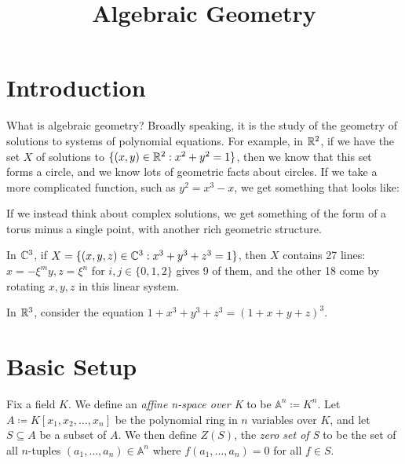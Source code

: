 \documentclass[10pt,a4paper]{article}
\title{Algebraic Geometry}
\begin{document}
\maketitle

\setcounter{section}{-1}

\section{Introduction}
What is algebraic geometry? Broadly speaking, it is the study of the geometry of solutions to systems of polynomial equations. For example, in $\mathbb{R}^2$, if we have the set $X$ of solutions to $\{(x,y)\in \mathbb{R}^2 : x^2+y^2 = 1\}$, then we know that this set forms a circle, and we know lots of geometric facts about circles. If we take a more complicated function, such as $y^2 = x^3-x$, we get something that looks like:

\begin{figure}[H]
\centering
{}
\end{figure}

If we instead think about complex solutions, we get something of the form of a torus minus a single point, with another rich geometric structure.

In $\mathbb{C}^3$, if $X = \{(x,y,z) \in \mathbb{C}^3 : x^3 + y^3 + z^3 = 1\}$, then $X$ contains 27 lines: $x = -\xi^m y, z = \xi^n$ for $i,j \in \{0,1,2\}$ gives 9 of them, and the other 18 come by rotating $x,y,z$ in this linear system.

In $\mathbb{R}^3$, consider the equation $1+x^3+y^3+z^3 = (1+x+y+z)^3$. %

\section{Basic Setup}
Fix a field $K$. We define an \emph{affine n-space over K} to be $\mathbb{A}^n \coloneqq K^n$. Let $A \coloneqq K[x_1,x_2,\ldots,x_n]$ be the polynomial ring in $n$ variables over $K$, and let $S \subseteq A$ be a subset of $A$. We then define $Z(S)$, the \emph{zero set of S} to be the set of all $n$-tuples $(a_1,\ldots,a_n) \in \mathbb{A}^n$ where $f(a_1,\ldots,a_n) = 0$ for all $f \in S$.
\end{document}
